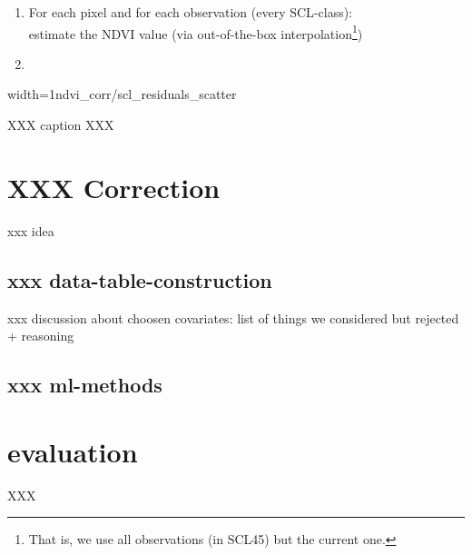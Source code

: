 \begin{enumerate}
    \item For each pixel and for each observation (every SCL-class):\\
          estimate the NDVI value (via out-of-the-box interpolation\footnote{That is, we use all observations (in SCL45) but the current one.})
    \item
\end{enumerate}







\begin{my_figure}[h]{width=1\textwidth}{ndvi_corr/scl_residuals_scatter}
    \caption{XXX caption XXX}
    \label{fig:ndvi_corr/scl_residuals_scatter}
\end{my_figure}


\section{XXX Correction}
xxx idea

\subsection{xxx data-table-construction}
xxx discussion about choosen covariates:
list of things we considered but rejected + reasoning

\subsection{xxx ml-methods}








\section{evaluation}
\begin{table}
	\begin{center}
		\caption{XXX}
		\small
		
		\normalsize
	\end{center}
\end{table}
